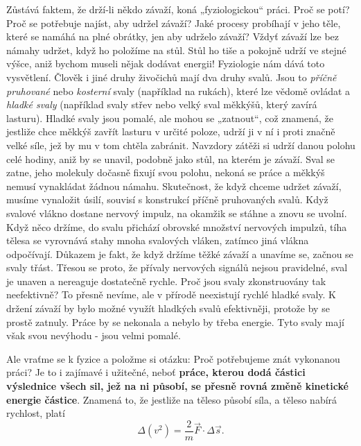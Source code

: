     Zůstává faktem, že drží-li někdo závaží, koná „fyziologickou“ práci. Proč se potí? Proč se 
    potřebuje najíst, aby udržel závaží? Jaké procesy probíhají v jeho těle, které se namáhá na 
    plné obrátky, jen aby udrželo závaží? Vždyť závaží lze bez námahy udržet, když ho položíme na 
    stůl. Stůl ho tiše a pokojně udrží ve stejné výšce, aniž bychom museli nějak dodávat energii! 
    Fyziologie nám dává toto vysvětlení. Člověk i jiné druhy živočichů mají dva druhy svalů. Jsou 
    to \emph{příčně pruhované} nebo \emph{kosterní} svaly (například na rukách), které lze vědomě 
    ovládat a \emph{hladké svaly} (například svaly střev nebo velký sval měkkýšů, který zavírá 
    lasturu). Hladké svaly jsou pomalé, ale mohou se „zatnout“, což znamená, že jestliže chce 
    měkkýš zavřít lasturu v určité poloze, udrží ji v ní i proti značně velké síle, jež by mu v tom 
    chtěla zabránit. Navzdory zátěži si udrží danou polohu celé hodiny, aniž by se unavil, podobně 
    jako stůl, na kterém je závaží. Sval se zatne, jeho molekuly dočasně fixují svou polohu, nekoná 
    se práce a měkkýš nemusí vynakládat žádnou námahu. Skutečnost, že když chceme udržet závaží, 
    musíme vynaložit úsilí, souvisí s konstrukcí příčně pruhovaných svalů. Když svalové vlákno 
    dostane nervový impulz, na okamžik se stáhne a znovu se uvolní. Když něco držíme, do svalu 
    přichází obrovské množství nervových impulzů, tíha tělesa se vyrovnává stahy mnoha svalových 
    vláken, zatímco jiná vlákna odpočívají. Důkazem je fakt, že když držíme těžké závaží a unavíme 
    se, začnou se svaly třást. Třesou se proto, že přívaly nervových signálů nejsou pravidelné, 
    sval je unaven a nereaguje dostatečně rychle. Proč jsou svaly zkonstruovány tak neefektivně? To 
    přesně nevíme, ale v přírodě neexistují rychlé hladké svaly. K držení závaží by bylo možné 
    využít hladkých svalů efektivněji, protože by se prostě zatnuly. Práce by se nekonala a nebylo 
    by třeba energie. Tyto svaly mají však svou nevýhodu - jsou velmi pomalé.
    
    Ale vraťme se k fyzice a položme si otázku: Proč potřebujeme znát vykonanou práci? Je to i 
    zajímavé i užitečné, neboť \textbf{práce, kterou dodá částici výslednice všech sil, jež na ni 
    působí, se přesně rovná změně kinetické energie částice}. Znamená to, že jestliže na těleso 
    působí síla, a těleso nabírá rychlost, platí
    \begin{equation}\label{fyz:eq018}
      \Delta(v^2) = \frac{2}{m}\vec{F}\cdot\Delta\vec{s}.
    \end{equation}
  
